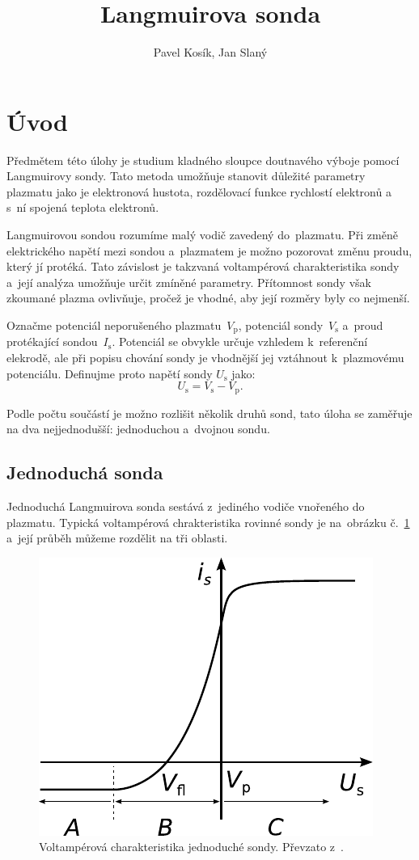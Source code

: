 \documentclass{protokol}
\title{Langmuirova sonda}
\author{Pavel Kosík, Jan Slaný}
\newcommand\iprobe{I_\mathrm{s}}
\newcommand\plpot{V_\mathrm{p}}
\newcommand\potprobe{V_\mathrm{s}}
\newcommand\uprobe{U_\mathrm{s}}
\begin{document}
\header

\section{Úvod}
\label{sec:intro}
\newcommand\parta{A}
\newcommand\partb{B}
\newcommand\partc{C}
\newcommand\slopeb{\beta}
Předmětem této úlohy je studium kladného sloupce doutnavého výboje
pomocí Langmuirovy sondy.
Tato metoda umožňuje stanovit důležité parametry plazmatu jako je
elektronová hustota, rozdělovací funkce rychlostí elektronů
a s~ní spojená teplota elektronů.

Langmuirovou sondou rozumíme malý vodič zavedený do~plazmatu.
Při změně elektrického napětí mezi sondou a~plazmatem je možno pozorovat
změnu proudu, který jí protéká.
Tato závislost je takzvaná voltampérová charakteristika sondy
a~její analýza umožňuje určit zmíněné parametry.
Přítomnost sondy však zkoumané plazma ovlivňuje,
pročež je vhodné, aby její rozměry byly co nejmenší.

Označme potenciál neporušeného plazmatu~$\plpot$,
potenciál sondy~$\potprobe$ a~proud protékající sondou~$\iprobe$.
Potenciál se obvykle určuje vzhledem k~referenční elekrodě,
ale při popisu chování sondy je vhodnější jej vztáhnout k~plazmovému
potenciálu.
Definujme proto napětí sondy $\uprobe$ jako:
\begin{equation}
	\label{eq:uprobe}
	\uprobe = \potprobe - \plpot.
\end{equation}

Podle počtu součástí je možno rozlišit několik druhů sond,
tato úloha se zaměřuje na dva nejjednodušší: jednoduchou a~dvojnou sondu.

\subsection{Jednoduchá sonda}
\label{sec:intro-simple}
Jednoduchá Langmuirova sonda sestává z~jediného vodiče vnořeného do plazmatu.
Typická voltampérová chrakteristika rovinné sondy je na~obrázku
č.~\ref{fig:vac-simple} a~její průběh můžeme rozdělit na tři oblasti.

\begin{figure}[hbp]
	\centering
	\includegraphics{vac-simple}
	\caption{Voltampérová charakteristika jednoduché sondy.
		Převzato z~\autocite{assignment-simpleprobe}.}
	\label{fig:vac-simple}
\end{figure}
\end{document}
